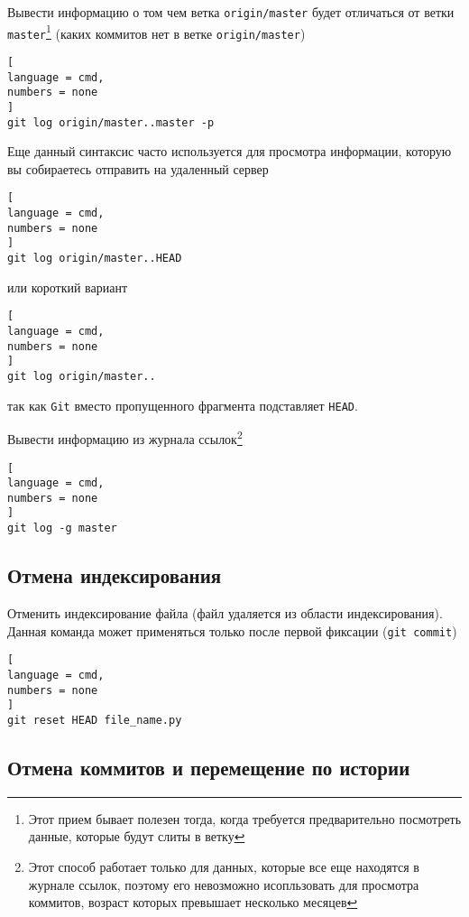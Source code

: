 \documentclass[%
	11pt,
	a4paper,
	utf8,
		]{article}
\begin{document}
Вывести информацию о том чем ветка \texttt{origin/master} будет отличаться от ветки \texttt{master}\footnote{Этот прием бывает полезен тогда, когда требуется предварительно посмотреть данные, которые будут слиты в ветку} (каких коммитов нет в ветке \texttt{origin/master})

\begin{lstlisting}[
language = cmd,
numbers = none
]
git log origin/master..master -p
\end{lstlisting}

Еще данный синтаксис часто используется для просмотра информации, которую вы собираетесь отправить на удаленный сервер

\begin{lstlisting}[
language = cmd,
numbers = none
]
git log origin/master..HEAD
\end{lstlisting}
или короткий вариант
\begin{lstlisting}[
language = cmd,
numbers = none
]
git log origin/master..
\end{lstlisting}
так как \texttt{Git} вместо пропущенного фрагмента подставляет \texttt{HEAD}.

Вывести информацию из журнала ссылок\footnote{Этот способ работает только для данных, которые все еще находятся в журнале ссылок, поэтому его невозможно исопльзовать для просмотра коммитов, возраст которых превышает несколько месяцев}

\begin{lstlisting}[
language = cmd,
numbers = none
]
git log -g master
\end{lstlisting}


\subsection{Отмена индексирования}

Отменить индексирование файла (файл удаляется из области индексирования). Данная команда может применяться только после первой фиксации (\texttt{git commit})

\begin{lstlisting}[
language = cmd,
numbers = none
]
git reset HEAD file_name.py
\end{lstlisting}

\subsection{Отмена коммитов и перемещение по истории}

\end{document}
